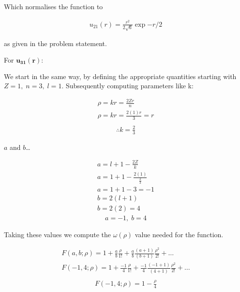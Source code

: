 \documentclass{article}
\begin{document}
    

    Which normalises the function to

    \begin{gather}
        u_{21}(r) = \frac{r^2}{2\sqrt{6}}\exp{-r/2}
    \end{gather}

    as given in the problem statement.

    \medskip

    For $\mathbf{u_{31}(r)}$:

    We start in the same way, by defining the appropriate quantities starting with $Z=1,\; n=3, \; l=1$.
    Subsequently computing parameters like k:

    \begin{gather*}
        \rho = kr = \frac{2Zr}{n}\\
        \rho = kr = \frac{2(1)r}{3} = r\\
    \end{gather*}\vspace{-1.5cm}
    \begin{gather}
        \therefore k = \frac{2}{3}
    \end{gather}

    $a$ and $b$\dots

    \begin{gather*} 
        a = l + 1 - \frac{2Z}{k}\\
        a = 1 + 1 - \frac{2(1)}{\frac{2}{3}}\\
        a = 1 + 1 - 3 = -1\\
        b = 2(l+1)\\
        b= 2(2) = 4
    \end{gather*}\vspace{-0.5cm}
    \begin{gather}
    a = -1, \; b= 4
    \end{gather}

    Taking these values we compute the $\omega(\rho)$ value needed for the function.

    \begin{gather*}
        F(a,b;\rho) = 1 + \frac{a}{b}\frac{\rho}{1!} + \frac{a}{b}\frac{(a+1)}{(b+1)}\frac{\rho^2}{2!} + \dots\\
        F(-1,4;\rho) = 1 + \frac{-1}{4}\frac{\rho}{1!} + \frac{-1}{4}\frac{(-1+1)}{(4+1)}\frac{\rho^2}{2!} + \dots\\
    \end{gather*}\vspace{-1.5cm}
    \begin{gather}
        F(-1,4;\rho) = 1 - \frac{\rho}{4} 
    \end{gather}
\end{document}

